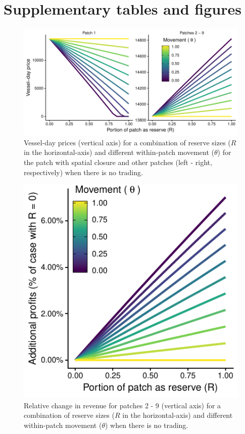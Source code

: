 \documentclass[12pt]{article}
\begin{document}
\clearpage

\FloatBarrier

\section{Supplementary tables and figures}

\begin{figure}[htbp]
\centering
\includegraphics{img/vessel_day_price_no_trading_plot.pdf}
\caption{\label{fig:vessel_day_price_no_trading_plot}Vessel-day prices (vertical axis) for a combination of reserve sizes ($R$ in the horizontal-axis) and different within-patch movement ($\theta$) for the patch with spatial closure and other patches (left - right, respectively) when there is no trading.}
\end{figure}

\begin{figure}[htbp]
\centering
\includegraphics{img/profits_PNA_notKIR_no_trading_plot.pdf}
\caption{\label{fig:profits_PNA_notKIR_no_trading_plot}Relative change in revenue for patches 2 - 9 (vertical axis) for a combination of reserve sizes ($R$ in the horizontal-axis) and different within-patch movement ($\theta$) when there is no trading.}
\end{figure}
\end{document}
